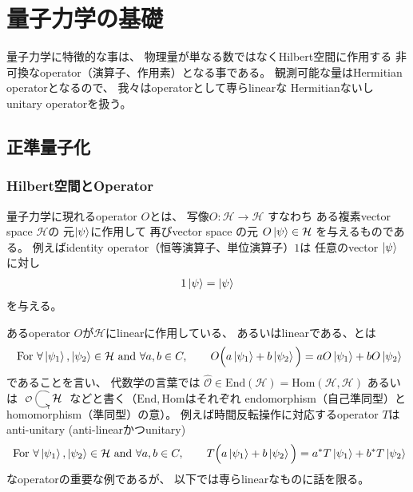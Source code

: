 \section{量子力学の基礎}

量子力学に特徴的な事は、
物理量が単なる数ではなくHilbert空間に作用する
非可換なoperator（演算子、作用素）となる事である。
観測可能な量はHermitian operatorとなるので、
我々はoperatorとして専らlinearな
Hermitianないしunitary operatorを扱う。

\subsection{正準量子化}

\subsubsection{Hilbert空間とOperator}

量子力学に現れるoperator $O$とは、
写像$O: \mathcal{H} \to \mathcal{H}$
すなわち
ある複素vector space $\mathcal{H}$の
元$\ket{\psi}$に作用して
再びvector space の元
$O\ket{\psi} \in \mathcal{H}$
を与えるものである。
例えばidentity operator（恒等演算子、単位演算子）$1$は
任意のvector $\ket{\psi}$に対し
\begin{align}
    1 \ket{\psi} = \ket{\psi}
\end{align}
を与える。

あるoperator $O$が$\mathcal{H}$にlinearに作用している、
あるいはlinearである、とは
\begin{align}
    \text{ For }
        \forall \ket{\psi_1}, \ket{\psi_2}
        \in \mathcal{H}
    \text{ and }
        \forall a,b\in C
    ,\qquad
        O\Big(
            a \ket{\psi_1}
            +
            b \ket{\psi_2}
        \Big)
    =
        a O \ket{\psi_1}
        +
        b O \ket{\psi_2}
\label{linearity of an operator}
\end{align}
であることを言い、
代数学の言葉では
$\hat{ \mathcal{O} } \in \mathrm{End}(\mathcal{H})
= \mathrm{Hom}(\mathcal{H}, \mathcal{H}) $
あるいは
$
    \xymatrix{
        \mathcal{H}
        \ar@(ul,dl)
        []_{ \hat{\mathcal{O}} }
    }
$
などと書く（$\mathrm{End}, \mathrm{Hom}$はそれぞれ
endomorphism（自己準同型）とhomomorphism（準同型）の意）。
例えば時間反転操作に対応するoperator $T$は
anti-unitary (anti-linearかつunitary)
\begin{align}
    \text{ For }
        \forall \ket{\psi_1}, \ket{\psi_2}
        \in \mathcal{H}
    \text{ and }
        \forall a,b\in C
    ,\qquad
        T\Big(
            a \ket{\psi_1}
            +
            b \ket{\psi_2}
        \Big)
    =
        a^* T \ket{\psi_1}
        +
        b^* T \ket{\psi_2}
\end{align}
なoperatorの重要な例であるが、
以下では専らlinearなものに話を限る。

